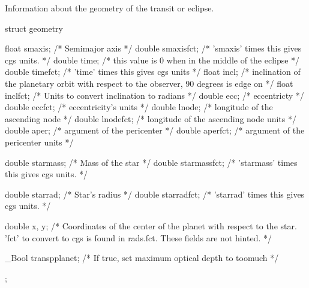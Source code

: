 \documentclass[letterpaper,12pt]{article}
\begin{document}
\noindent
Information about the geometry of the transit or eclipse.
\begin{plain}
struct geometry{
  float smaxis;       /* Semimajor axis                                     */
  double smaxisfct;   /* 'smaxis' times this gives cgs units.               */
  double time;        /* this value is 0 when in the middle of the eclipse  */
  double timefct;     /* 'time' times this gives cgs units                  */
  float incl;         /* inclination of the planetary orbit with respect
                         to the observer, 90 degrees is edge on             */
  float inclfct;      /* Units to convert inclination to radians            */
  double ecc;         /* eccentricty                                        */
  double eccfct;      /* eccentricity's units                               */
  double lnode;       /* longitude of the ascending node                    */
  double lnodefct;    /* longitude of the ascending node units              */
  double aper;        /* argument of the pericenter                         */
  double aperfct;     /* argument of the pericenter units                   */

  double starmass;    /* Mass of the star                                   */
  double starmassfct; /* 'starmass' times this gives cgs units.             */

  double starrad;     /* Star's radius                                      */
  double starradfct;  /* 'starrad' times this gives cgs units.              */

  double x, y;        /*  Coordinates of the center of the planet with
                         respect to the star. 'fct' to convert to cgs is
                         found in rads.fct. These fields are not hinted.    */

  _Bool transpplanet; /* If true, set maximum optical depth to toomuch      */
};
\end{plain}
\end{document}
